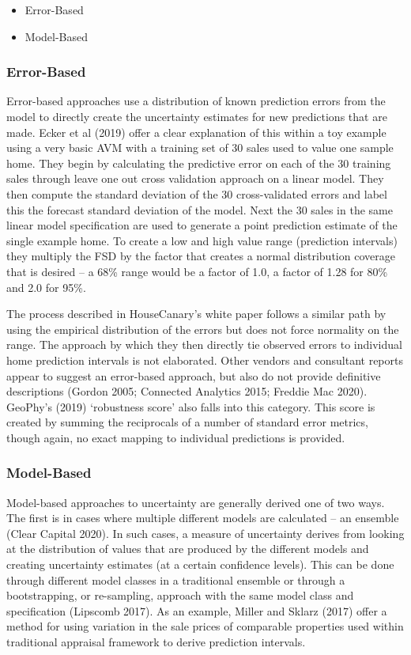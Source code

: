 \documentclass[colTwo]{anon}
\theoremstyle{definition}
\begin{document}
\begin{itemize}
\item Error-Based
\item Model-Based
\end{itemize}

\subsubsection{Error-Based}

Error-based approaches use a distribution of known prediction errors from the model to directly create the uncertainty estimates for new predictions that are made.  Ecker et al (2019) offer a clear explanation of this within a toy example using a very basic AVM with a training set of 30 sales used to value one sample home.  They begin by calculating the predictive error on each of the 30 training sales through leave one out cross validation approach on a linear model.  They then compute the standard deviation of the 30 cross-validated errors and label this the forecast standard deviation of the model. Next the 30 sales in the same linear model specification are used to generate a point prediction estimate of the single example home.  To create a low and high value range (prediction intervals) they multiply the FSD by the factor that creates a normal distribution coverage that is desired -- a 68\% range would be a factor of 1.0, a factor of 1.28 for 80\% and 2.0 for 95\%. 

The process described in HouseCanary’s white paper follows a similar path by using the empirical distribution of the errors but does not force normality on the range. The approach by which they then directly tie observed errors to individual home prediction intervals is not elaborated. Other vendors and consultant reports appear to suggest an error-based approach, but also do not provide definitive descriptions (Gordon 2005; Connected Analytics 2015; Freddie Mac 2020). GeoPhy’s (2019) ‘robustness score’ also falls into this category.  This score is created by summing the reciprocals of a number of standard error metrics, though again, no exact mapping to individual predictions is provided.  

\subsubsection{Model-Based}

Model-based approaches to uncertainty are generally derived one of two ways.  The first is in cases where multiple different models are calculated -- an ensemble (Clear Capital 2020).  In such cases, a measure of uncertainty derives from looking at the distribution of values that are produced by the different models and creating uncertainty estimates (at a certain confidence levels). This can be done through different model classes in a traditional ensemble or through a bootstrapping, or re-sampling, approach with the same model class and specification (Lipscomb 2017).  As an example, Miller and Sklarz (2017) offer a method for using variation in the sale prices of comparable properties used within traditional appraisal framework to derive prediction intervals.  
\end{document}
